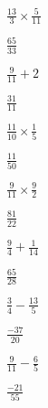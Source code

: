 \documentclass[12pt]{exam}
\begin{document}
\begin{questions}
\begin{multicols}{2}
            \question $\frac{13}{3} \times \frac{5}{11}$

            \begin{solution}

                $\frac{65}{33}$

            \end{solution}


            \question $\frac{9}{11} + 2$

            \begin{solution}

                $\frac{31}{11}$

            \end{solution}


            \question $\frac{11}{10} \times \frac{1}{5}$

            \begin{solution}

                $\frac{11}{50}$

            \end{solution}


            \question $\frac{9}{11} \times \frac{9}{2}$

            \begin{solution}

                $\frac{81}{22}$

            \end{solution}


            \question $\frac{9}{4} + \frac{1}{14}$

            \begin{solution}

                $\frac{65}{28}$

            \end{solution}


            \question $\frac{3}{4} - \frac{13}{5}$

            \begin{solution}

                $\frac{-37}{20}$

            \end{solution}


            \question $\frac{9}{11} - \frac{6}{5}$

            \begin{solution}

                $\frac{-21}{55}$

            \end{solution}



\end{multicols}
\end{questions}
\end{document}
